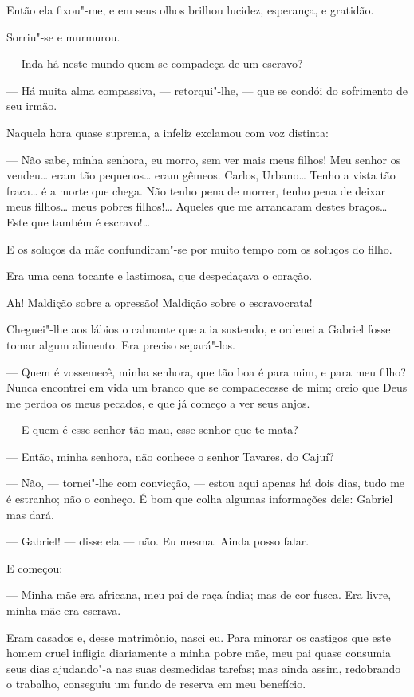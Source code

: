 Então ela fixou"-me, e em seus olhos brilhou lucidez, esperança, e
gratidão.

Sorriu"-se e murmurou.

--- Inda há neste mundo quem se compadeça de um escravo?

--- Há muita alma compassiva, --- retorqui"-lhe, --- que se condói do
sofrimento de seu irmão.

Naquela hora quase suprema, a infeliz exclamou com voz distinta:

--- Não sabe, minha senhora, eu morro, sem ver mais meus filhos! Meu
senhor os vendeu\ldots{} eram tão pequenos\ldots{} eram gêmeos. Carlos, Urbano\ldots{}
Tenho a vista tão fraca\ldots{} é a morte que chega. Não tenho pena de
morrer, tenho pena de deixar meus filhos\ldots{} meus pobres filhos!\ldots{}
Aqueles que me arrancaram destes braços\ldots{} Este que também é escravo!\ldots{}

E os soluços da mãe confundiram"-se por muito tempo com os soluços do
filho.

Era uma cena tocante e lastimosa, que despedaçava o coração.

Ah! Maldição sobre a opressão! Maldição sobre o escravocrata!

Cheguei"-lhe aos lábios o calmante que a ia sustendo, e ordenei a Gabriel
fosse tomar algum alimento. Era preciso separá"-los.

--- Quem é vossemecê, minha senhora, que tão boa é para mim, e para meu
filho? Nunca encontrei em vida um branco que se compadecesse de mim;
creio que Deus me perdoa os meus pecados, e que já começo a ver seus
anjos.

--- E quem é esse senhor tão mau, esse senhor que te mata?

--- Então, minha senhora, não conhece o senhor Tavares, do Cajuí?

--- Não, --- tornei"-lhe com convicção, --- estou aqui apenas há dois dias,
tudo me é estranho; não o conheço. É bom que colha algumas informações
dele: Gabriel mas dará.

--- Gabriel! --- disse ela --- não. Eu mesma. Ainda posso falar.

E começou:

--- Minha mãe era africana, meu pai de raça índia; mas de cor fusca. Era
livre, minha mãe era escrava.

Eram casados e, desse matrimônio, nasci eu. Para minorar os castigos que
este homem cruel infligia diariamente a minha pobre mãe, meu pai quase
consumia seus dias ajudando"-a nas suas desmedidas tarefas; mas ainda
assim, redobrando o trabalho, conseguiu um fundo de reserva em meu
benefício.

